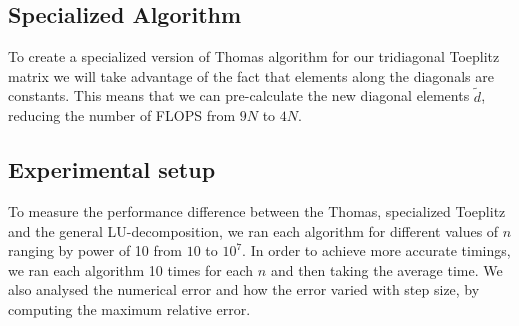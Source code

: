 \subsection*{Specialized Algorithm}
To create a specialized version of Thomas algorithm for our tridiagonal Toeplitz
matrix we will take
advantage of the fact that elements along the diagonals are constants. This
means that we can pre-calculate the new diagonal elements $\tilde{d}$, reducing
the number of FLOPS from $9N$ to $4N$.

\subsection*{Experimental setup}
To measure the performance difference between the Thomas, specialized
Toeplitz and the general LU-decomposition, we ran each algorithm for different
values of $n$ ranging by power of 10 from $10$ to $10^7$. In order to achieve
more accurate timings, we ran each algorithm 10 times for each $n$ and then
taking the average time. We also analysed the numerical error and how the error
varied with step size, by computing the maximum relative error.
